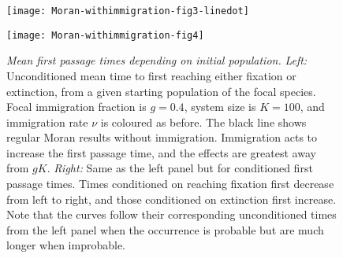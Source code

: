 \begin{figure}[h]
	\centering
	\begin{minipage}{0.49\linewidth}
		\centering
		\texttt{[image: Moran-withimmigration-fig3-linedot]}
	\end{minipage}
	\begin{minipage}{0.49\linewidth}
		\centering
		\texttt{[image: Moran-withimmigration-fig4]}
	\end{minipage}
	\caption{\emph{Mean first passage times depending on initial population.}
		\emph{Left:} Unconditioned mean time to first reaching either fixation or extinction, from a given starting population of the focal species. Focal immigration fraction is $g=0.4$, system size is $K=100$, and immigration rate $\nu$ is coloured as before. The black line shows regular Moran results without immigration. Immigration acts to increase the first passage time, and the effects are greatest away from $gK$. 
		\emph{Right:} Same as the left panel but for conditioned first passage times. Times conditioned on reaching fixation first decrease from left to right, and those conditioned on extinction first increase. Note that the curves follow their corresponding unconditioned times from the left panel when the occurrence is probable but are much longer when improbable. 
	} \label{extntimefig}
\end{figure}

